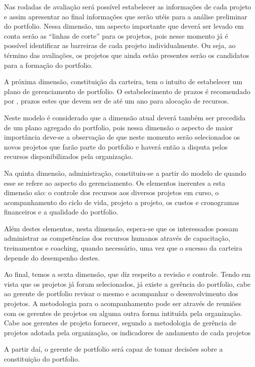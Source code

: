 \documentclass[12pt,a4paper,ruledheader,tocpage=prefix,floatnumber=continuous,pagestart=folhaderosto,font=times]{abnt}
\begin{document}
Nas rodadas de avaliação será possível estabelecer as informações de cada projeto e assim apresentar ao final informações que serão utéis para a análise 
preliminar do portfolio. Nessa dimensão, um aspecto importante que deverá ser levado em conta serão as ``linhas de corte'' para os projetos, pois nesse 
momento já é possível identificar as barreiras de cada projeto individualmente. Ou seja, ao término das avaliações, os projetos que ainda estão presentes 
serão os candidatos para a formação do portfolio.

A próxima dimensão, constituição da carteira, tem o intuito de estabelecer um plano de gerenciamento de portfolio. O estabelecimento de prazos é 
recomendado por \cite{WHEELWRIGHT1993}, prazos estes que devem ser de até um ano para alocação de recursos. 

Neste modelo é considerado que a dimensão atual deverá também ser precedida de um plano agregado do portfolio, pois nessa dimensão o aspecto de maior 
importância deve-se a observação de que neste momento serão selecionados os novos projetos que farão parte do portfolio e haverá então a disputa pelos 
recursos disponibilizados pela organização.

Na quinta dimensão, administração, constituiu-se a partir do modelo de \cite{CRAWFORD2002} quando esse se refere ao aspecto do gerenciamento. Os elementos 
inerentes a esta dimensão são: o controle dos recursos aos diversos projetos em curso, o acompanhamento do ciclo de vida, projeto a projeto, os custos e 
cronogramas financeiros e a qualidade do portfolio. 

Além destes elementos, nesta dimensão, espera-se que os interessados possam administrar as competências dos recursos humanos através de capacitação, 
treinamentos e coaching, quando necessário, uma vez que o sucesso da carteira depende do desempenho destes.

Ao final, temos a sexta dimensão, que diz respeito a revisão e controle. Tendo em vista que os projetos já foram selecionados, já existe a gerência do 
portfolio, cabe ao gerente de portfolio revisar o mesmo e acompanhar o desenvolvimento dos projetos. A metodologia para o acompanhamento pode ser através 
de reuniões com os gerentes de projetos ou alguma outra forma intituída pela organização. Cabe aos gerentes de projeto fornecer, segundo a metodologia de 
gerência de projetos adotada pela organização, os indicadores de andamento de cada projetos

A partir daí, o gerente de portfolio será capaz de tomar decisões sobre a constituição do portfolio.
\end{document}

